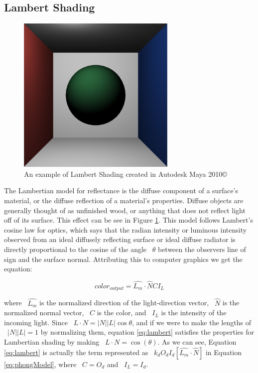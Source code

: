 \subsection{Lambert Shading}
\label{subsec: Lambert Shading}
\begin{figure}[h]
\centering
\includegraphics[height=3.0in]{figures/lambert_Maya.png}
\caption{An example of Lambert Shading created in Autodesk Maya 2010\copyright}
\label{fig:lambertmaya}
\end{figure}
The Lambertian model for reflectance is the diffuse component of a surface's material, or the diffuse reflection of a material's properties.  Diffuse objects are generally thought of as unfinished wood, or anything that does not reflect light off of its surface.  This effect can be see in Figure \ref{fig:lambertmaya}. This model follows Lambert's cosine law for optics, which says that the radian intensity or luminous intensity observed from an ideal diffusely reflecting surface or ideal diffuse radiator is directly proportional to the cosine of the angle ~$\theta$ between the observers line of sign and the surface normal.  Attributing this to computer graphics we get the equation:

\begin{equation}
\label{eq:lambert}
color_{output} = \hat{L_{m}} \cdot \hat{N} CI_{L}
\end{equation}

where ~$\hat{L_{m}}$ is the normalized direction of the light-direction vector, ~$\hat{N}$ is the normalized normal vector, ~$C$ is the color, and ~$I_{L}$ is the intensity of the incoming light.  Since ~$L \cdot N =  |N||L|\cos{\theta}$, and if we were to make the lengths of ~$|N||L| = 1$ by normalizing them, equation \ref{eq:lambert} satisfies the properties for Lambertian shading by making ~$L \cdot N = \cos(\theta)$.  As we can see, Equation \ref{eq:lambert} is actually the term represented as ~$k_{d}O_{d}I_{d}[\hat{L_{m}} \cdot \hat{N}]$ in Equation \ref{eq:phongModel}, where ~$C = O_{d}$ and ~$I_{L} = I_{d}$.

